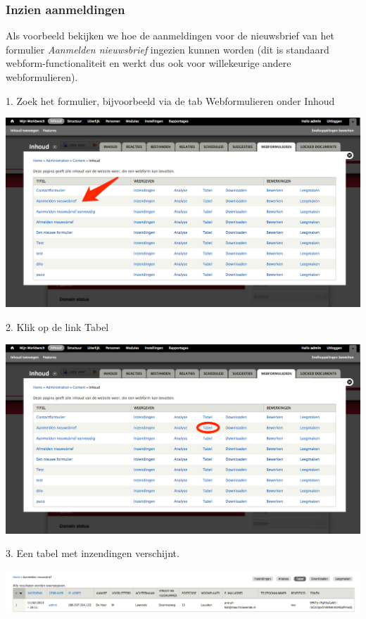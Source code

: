 \subsubsection{Inzien aanmeldingen}
\label{sec:inzienaanmeldingen}
Als voorbeeld bekijken we hoe de aanmeldingen voor de nieuwsbrief van het 
formulier \emph{Aanmelden nieuwsbrief} ingezien kunnen worden (dit is standaard webform-functionaliteit 
en werkt dus ook voor willekeurige andere webformulieren).

1. Zoek het formulier, bijvoorbeeld via de tab Webformulieren onder Inhoud
\begin{center}
\includegraphics[width=\textwidth]{img/nieuwsbrief/form_aanmelden_nieuwsbrief.png}
\end{center}

2. Klik op de link Tabel
\begin{center}
\includegraphics[width=\textwidth]{img/nieuwsbrief/aanmelden_nieuwsbrief_tabellink.png}
\end{center}

3. Een tabel met inzendingen verschijnt.
\begin{center}
\includegraphics[width=\textwidth]{img/nieuwsbrief/aanmelden_nieuwsbrief_inzendingen.png}
\end{center}

